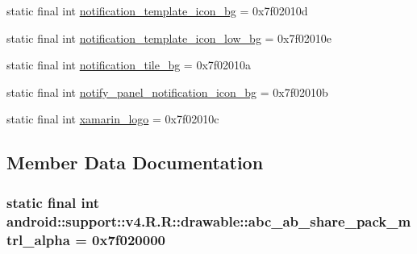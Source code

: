 \begin{CompactItemize}
\item 
static final int \hyperlink{classandroid_1_1support_1_1v4_1_1_r_1_1drawable_c0493d3d35f89a1059971edc6da3d17b}{notification\_\-template\_\-icon\_\-bg} = 0x7f02010d
\item 
static final int \hyperlink{classandroid_1_1support_1_1v4_1_1_r_1_1drawable_4e1752af0c518ab182778775dd36b43e}{notification\_\-template\_\-icon\_\-low\_\-bg} = 0x7f02010e
\item 
static final int \hyperlink{classandroid_1_1support_1_1v4_1_1_r_1_1drawable_2f980d0898bf42b408c1424244bcf45f}{notification\_\-tile\_\-bg} = 0x7f02010a
\item 
static final int \hyperlink{classandroid_1_1support_1_1v4_1_1_r_1_1drawable_1cfdcfd7af383c8e3ae71ec746a9020a}{notify\_\-panel\_\-notification\_\-icon\_\-bg} = 0x7f02010b
\item 
static final int \hyperlink{classandroid_1_1support_1_1v4_1_1_r_1_1drawable_176ad49d5245bbceba4ede9824317f46}{xamarin\_\-logo} = 0x7f02010c
\end{CompactItemize}


\subsection{Member Data Documentation}
\hypertarget{classandroid_1_1support_1_1v4_1_1_r_1_1drawable_47e6170c82fbc94b949eed9be45afa5c}{
\subsubsection[{abc\_\-ab\_\-share\_\-pack\_\-mtrl\_\-alpha}]{\setlength{\rightskip}{0pt plus 5cm}static final int android::support::v4.R.R::drawable::abc\_\-ab\_\-share\_\-pack\_\-mtrl\_\-alpha = 0x7f020000}}
\label{classandroid_1_1support_1_1v4_1_1_r_1_1drawable_47e6170c82fbc94b949eed9be45afa5c}


